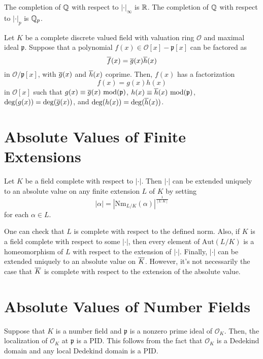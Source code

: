 \begin{example}
    The completion of $\mathbb{Q}$ with respect to $|\cdot|_\infty$ is $\mathbb{R}$. The completion of $\mathbb{Q}$ with respect to $|\cdot|_p$ is $\mathbb{Q}_p$.
\end{example}

\begin{theorem}
    Let $K$ be a complete discrete valued field with valuation ring $\mathcal{O}$ and maximal ideal $\mathfrak{p}$. Suppose that a polynomial $f(x) \in \mathcal{O}[x] - \mathfrak{p}[x]$ can be factored as
        \[\overline{f}(x) = \overline{g}(x)\overline{h}(x)\]
    in $\mathcal{O}/\mathfrak{p}[x]$, with $\overline{g}(x)$ and $\overline{h}(x)$ coprime. Then, $f(x)$ has a factorization
        \[f(x) = g(x) h(x)\]
    in $\mathcal{O}[x]$ such that $g(x) \equiv \overline{g}(x) \textrm{ mod}(\mathfrak{p})$, $h(x) \equiv \overline{h}(x) \textrm{ mod}(\mathfrak{p})$, $\deg(g(x)) = \deg(\overline{g}(x))$, and $\deg(h(x)) = \deg(\overline{h}(x))$.
\end{theorem}

\section{Absolute Values of Finite Extensions}


\begin{theorem}
    Let $K$ be a field complete with respect to $|\cdot|$. Then $|\cdot|$ can be extended uniquely to an absolute value on any finite extension $L$ of $K$ by setting
        \[|\alpha| = \left| \textrm{Nm}_{L/K}(\alpha)\right|^{\frac{1}{[L:K]}}\]
    for each $\alpha \in L$.
\end{theorem}

One can check that $L$ is complete with respect to the defined norm. Also, if $K$ is a field complete with respect to some $|\cdot|$, then every element of $\textrm{Aut}(L/K)$ is a homeomorphism of $L$ with respect to the extension of $|\cdot|$. Finally, $|\cdot|$ can be extended uniquely to an absolute value on $\overline{K}$. However, it's not necessarily the case that $\overline{K}$ is complete with respect to the extension of the absolute value.

\section{Absolute Values of Number Fields}

Suppose that $K$ is a number field and $\mathfrak{p}$ is a nonzero prime ideal of $\mathcal{O}_{K}$. Then, the localization  
of $\mathcal{O}_{K}$ at $\mathfrak{p}$  is a PID. This follows from the fact that $\mathcal{O}_{K}$ is a Dedekind domain and any local Dedekind domain is a PID.\\

